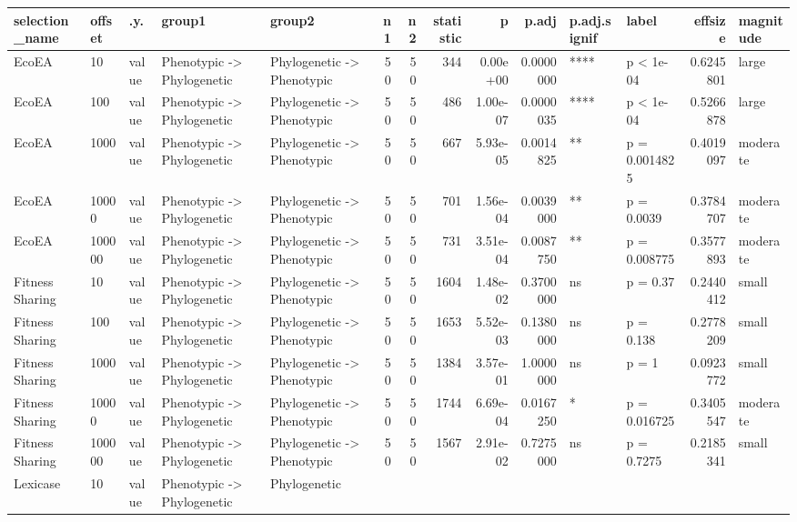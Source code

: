 \documentclass[]{book}
\begin{document}
\begin{table}
\centering
\begin{tabular}[t]{l|l|l|l|l|r|r|r|r|r|l|l|r|l}
\hline
selection\_name & offset & .y. & group1 & group2 & n1 & n2 & statistic & p & p.adj & p.adj.signif & label & effsize & magnitude\\
\hline
EcoEA & 10 & value & Phenotypic
    ->
Phylogenetic & Phylogenetic
    ->
Phenotypic & 50 & 50 & 344 & 0.00e+00 & 0.0000000 & **** & p < 1e-04 & 0.6245801 & large\\
\hline
EcoEA & 100 & value & Phenotypic
    ->
Phylogenetic & Phylogenetic
    ->
Phenotypic & 50 & 50 & 486 & 1.00e-07 & 0.0000035 & **** & p < 1e-04 & 0.5266878 & large\\
\hline
EcoEA & 1000 & value & Phenotypic
    ->
Phylogenetic & Phylogenetic
    ->
Phenotypic & 50 & 50 & 667 & 5.93e-05 & 0.0014825 & ** & p = 0.0014825 & 0.4019097 & moderate\\
\hline
EcoEA & 10000 & value & Phenotypic
    ->
Phylogenetic & Phylogenetic
    ->
Phenotypic & 50 & 50 & 701 & 1.56e-04 & 0.0039000 & ** & p = 0.0039 & 0.3784707 & moderate\\
\hline
EcoEA & 100000 & value & Phenotypic
    ->
Phylogenetic & Phylogenetic
    ->
Phenotypic & 50 & 50 & 731 & 3.51e-04 & 0.0087750 & ** & p = 0.008775 & 0.3577893 & moderate\\
\hline
Fitness Sharing & 10 & value & Phenotypic
    ->
Phylogenetic & Phylogenetic
    ->
Phenotypic & 50 & 50 & 1604 & 1.48e-02 & 0.3700000 & ns & p = 0.37 & 0.2440412 & small\\
\hline
Fitness Sharing & 100 & value & Phenotypic
    ->
Phylogenetic & Phylogenetic
    ->
Phenotypic & 50 & 50 & 1653 & 5.52e-03 & 0.1380000 & ns & p = 0.138 & 0.2778209 & small\\
\hline
Fitness Sharing & 1000 & value & Phenotypic
    ->
Phylogenetic & Phylogenetic
    ->
Phenotypic & 50 & 50 & 1384 & 3.57e-01 & 1.0000000 & ns & p = 1 & 0.0923772 & small\\
\hline
Fitness Sharing & 10000 & value & Phenotypic
    ->
Phylogenetic & Phylogenetic
    ->
Phenotypic & 50 & 50 & 1744 & 6.69e-04 & 0.0167250 & * & p = 0.016725 & 0.3405547 & moderate\\
\hline
Fitness Sharing & 100000 & value & Phenotypic
    ->
Phylogenetic & Phylogenetic
    ->
Phenotypic & 50 & 50 & 1567 & 2.91e-02 & 0.7275000 & ns & p = 0.7275 & 0.2185341 & small\\
\hline
Lexicase & 10 & value & Phenotypic
    ->
Phylogenetic & Phylogenetic

\end{tabular}
\end{table}
\end{document}
